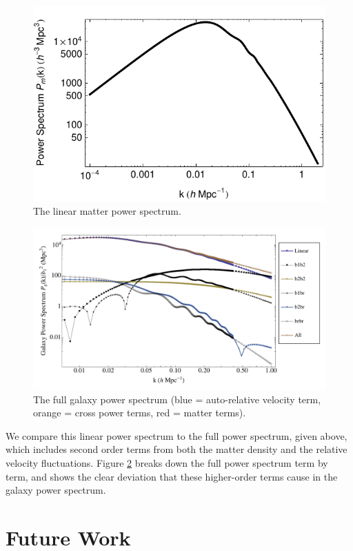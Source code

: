 \documentclass[12pt]{article}
\begin{document}
\begin{figure}[h]
	\centering
	\includegraphics[width=12cm]{Pm}
	\caption{The linear matter power spectrum.}
	\label{Pm}
\end{figure}

\begin{figure}[h]
	\centering
	\includegraphics[width=15cm]{PSbd}
	\caption{The full galaxy power spectrum (blue = auto-relative velocity term, orange = cross power terms, red = matter terms).}
	\label{PSbd}
\end{figure}

We compare this linear power spectrum to the full power spectrum, given above, which includes second order terms from both the matter density and the relative velocity fluctuations. Figure \ref{PSbd} breaks down the full power spectrum term by term, and shows the clear deviation that these higher-order terms cause in the galaxy power spectrum. 

\section{Future Work}
\end{document}
